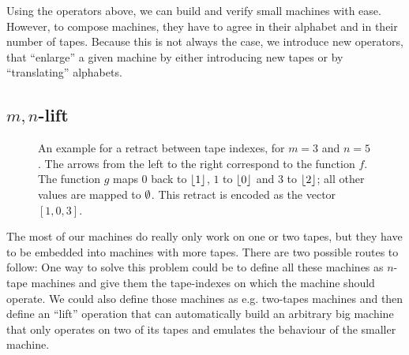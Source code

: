 \documentclass{psartcl}
\begin{document}
Using the operators above, we can build and verify small machines with ease.  However, to compose machines, they have to agree in their alphabet and in
their number of tapes.  Because this is not always the case, we introduce new operators, that ``enlarge'' a given machine by either introducing new
tapes or by ``translating'' alphabets.


\subsection{\texorpdfstring{$m,n$}{m,n}-lift}
\label{sub:m-n}

\begin{figure}
  \center
  \caption{An example for a retract between tape indexes, for $m=3$ and $n=5$.  The arrows from the left to the right correspond to the
    function $f$. The function $g$ maps $0$ back to $\left\lfloor {1}\right\rfloor$, $1$ to $\left\lfloor {0}\right\rfloor$ and $3$ to $\left\lfloor {2}\right\rfloor$; all other values are mapped to $\emptyset$.
  This retract is encoded as the vector $[1,0,3]$.}
  \label{fig:m-n-lift-example-mapping}
\end{figure}

The most of our machines do really only work on one or two tapes, but they have to be embedded into machines with more tapes.  There are two possible
routes to follow: One way to solve this problem could be to define all these machines as $n$-tape machines and give them the tape-indexes on which the
machine should operate.  We could also define those machines as e.g. two-tapes machines and then define an ``lift'' operation that can automatically
build an arbitrary big machine that only operates on two of its tapes and emulates the behaviour of the smaller machine.
\end{document}

